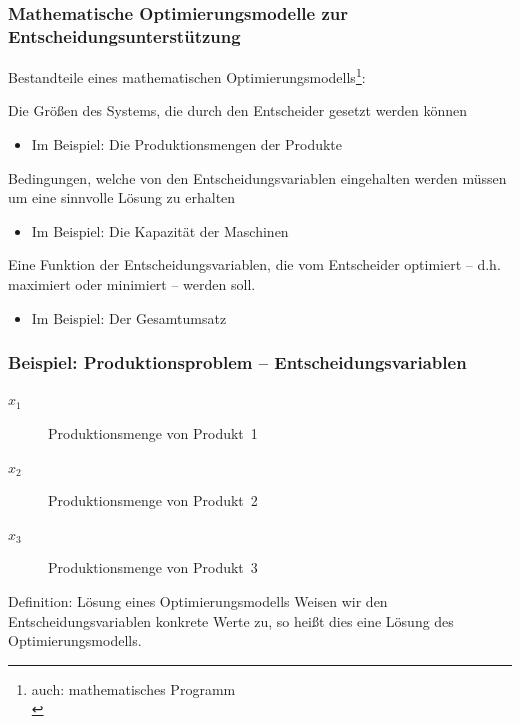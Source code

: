 \begin{frame}
 \frametitle{Mathematische Optimierungsmodelle zur Entscheidungsunterstützung}
 Bestandteile eines mathematischen Optimierungsmodells\footnote{auch: mathematisches Programm\\\mbox{}}:
 \begin{description}\footnotesize
  \item[Entscheidungsvariablen] Die Größen des Systems, die durch den Entscheider gesetzt werden können
  \begin{itemize}
   \item Im Beispiel: Die Produktionsmengen der Produkte
  \end{itemize}
  \item[Nebenbedingungen] Bedingungen, welche von den Entscheidungsvariablen eingehalten werden müssen um eine sinnvolle Lösung zu erhalten
  \begin{itemize}
   \item Im Beispiel: Die Kapazität der Maschinen
  \end{itemize}  
  \item[Zielfunktion] Eine Funktion der Entscheidungsvariablen, die vom Entscheider optimiert -- d.h. maximiert oder minimiert -- werden soll.
  \begin{itemize}
   \item Im Beispiel: Der Gesamtumsatz
  \end{itemize}  
 \end{description}
\end{frame}

\begin{frame}
 \frametitle{Beispiel: Produktionsproblem -- Entscheidungsvariablen}
 \begin{description}
  \item[$x_1$] Produktionsmenge von Produkt~1
  \item[$x_2$] Produktionsmenge von Produkt~2 
  \item[$x_3$] Produktionsmenge von Produkt~3 
 \end{description}
 
 \begin{block}{Definition: Lösung eines Optimierungsmodells}
  Weisen wir den Entscheidungsvariablen konkrete Werte zu, so heißt dies eine Lösung des Optimierungsmodells. 
 \end{block}
\end{frame}


